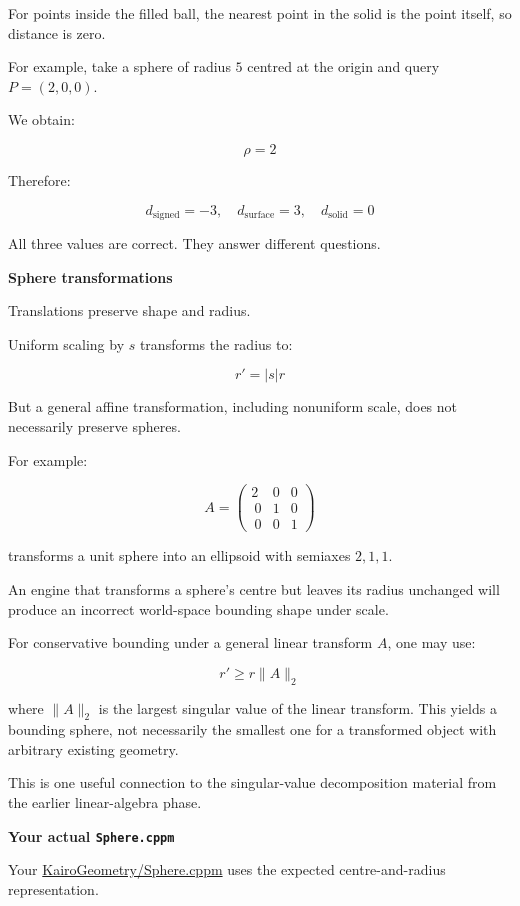 For points inside the filled ball, the nearest point in the solid is the point itself, so distance is zero.

For example, take a sphere of radius \(5\) centred at the origin and query \(P=(2,0,0)\).

We obtain:

\[
\rho=2
\]

Therefore:

\[
d_{\mathrm{signed}}=-3,\quad d_{\mathrm{surface}}=3,\quad d_{\mathrm{solid}}=0
\]

All three values are correct. They answer different questions.

\textbf{Sphere transformations}

Translations preserve shape and radius.

Uniform scaling by \(s\) transforms the radius to:

\[
r'=|s|r
\]

But a general affine transformation, including nonuniform scale, does not necessarily preserve spheres.

For example:

\[
A= \begin{pmatrix} 2&0&0\\\ 0&1&0\\\ 0&0&1 \end{pmatrix}
\]

transforms a unit sphere into an ellipsoid with semiaxes \(2,1,1\).

An engine that transforms a sphere's centre but leaves its radius unchanged will produce an incorrect world-space bounding shape under scale.

For conservative bounding under a general linear transform \(A\), one may use:

\[
r'\ge r\|A\|_2
\]

where \(\|A\|_2\) is the largest singular value of the linear transform. This yields a bounding sphere, not necessarily the smallest one for a transformed object with arbitrary existing geometry.

This is one useful connection to the singular-value decomposition material from the earlier linear-algebra phase.

\textbf{Your actual \texttt{Sphere.cppm}}

Your \href{https://github.com/swayam8624/KairoGeometry/blob/master/Sphere.cppm?utm_source=chatgpt.com}{KairoGeometry/Sphere.cppm} uses the expected centre-and-radius representation.

